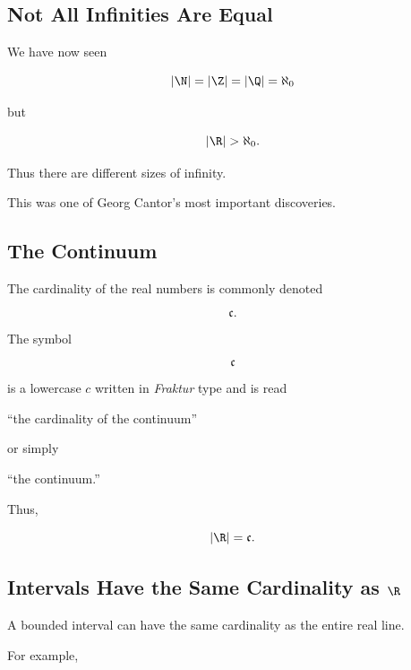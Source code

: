 \subsection{Not All Infinities Are Equal}
\label{subsec:not-all-infinities-equal}

We have now seen

\[ |\N|=|\Z|=|\Q|=\aleph_0 \]

but

\[ |\R|>\aleph_0. \]

Thus there are different sizes of infinity.

This was one of Georg Cantor's most important discoveries.

\subsection{The Continuum}
\label{subsec:continuum-cardinality}

The cardinality of the real numbers is commonly denoted

\[ \mathfrak c. \]

The symbol

\[ \mathfrak c \]

is a lowercase \(c\) written in \emph{Fraktur} type and is read

\begin{center}
``the cardinality of the continuum''
\end{center}

or simply

\begin{center}
``the continuum.''
\end{center}

Thus,

\[ |\R|=\mathfrak c. \]

\subsection{Intervals Have the Same Cardinality as \(\R\)}
\label{subsec:intervals-cardinality}

A bounded interval can have the same cardinality as the entire real line.

For example,

